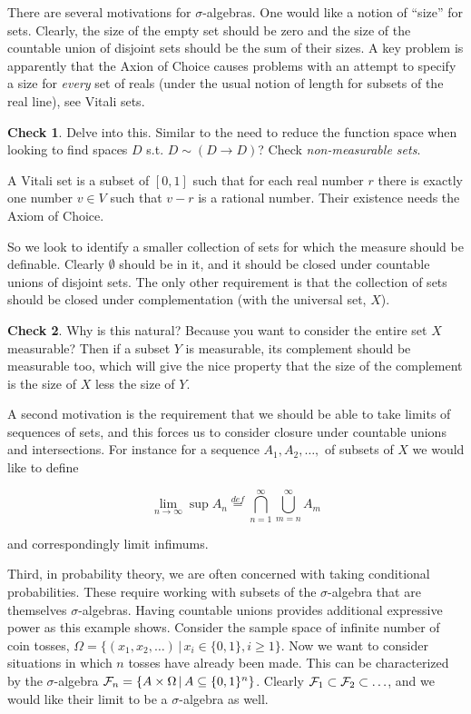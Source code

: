 \documentclass{article}
\newcommand{\alt}{\,|\,}
\newcommand{\defeq}{\stackrel{{\scriptscriptstyle def}}{=}}
\theoremstyle{definition}
\newtheorem*{CHECK}{{\sc Check}}
\begin{document}
There are several motivations for \(\sigma\)-algebras. One would like a notion of ``size'' for sets. Clearly, the size of the empty set should be zero and the size of the countable union of disjoint sets should be the sum of their sizes. A key problem is apparently that the Axion of Choice causes problems with an attempt to specify a size for {\em every} set of reals (under the usual notion of length for subsets of the real line), see Vitali sets.

\begin{CHECK}
  Delve into this. Similar to the need to reduce the function space when looking to find spaces \(D\) s.t. \(D \sim (D \rightarrow D)\)? Check {\em non-measurable sets}.

  A Vitali set is a subset of \([0,1]\) such that for each real number \(r\) there is exactly one number \(v\in V\) such that \(v-r\) is a rational number. Their existence needs the Axiom of Choice.
\end{CHECK}

So we look to identify a smaller collection of sets for which the measure should be definable. Clearly \(\emptyset\) should be in it, and it should be closed under countable unions of disjoint sets. The only other requirement is that the collection of sets should be closed under complementation (with the universal set, \(X\)).

\begin{CHECK}
Why is this natural? Because you want to consider the entire set \(X\) measurable? Then if a subset \(Y\) is measurable, its complement should be measurable too, which will give the nice property that the size of the complement is the size of \(X\) less the size of \(Y\).
\end{CHECK}

A second motivation is the requirement that we should be able to take limits of sequences of sets, and this forces us to consider closure under countable unions and intersections. For instance for a sequence \(A_1, A_2, \ldots, \) of subsets of \(X\) we would like to define

\[ \lim_{n \to \infty} \sup{} A_n \defeq \bigcap_{n=1}^{\infty} \bigcup_{m=n}^{\infty} A_m
\]

\noindent and correspondingly  limit infimums.

Third, in probability theory, we are often concerned with taking conditional probabilities. These require working with subsets of the \(\sigma\)-algebra that are themselves \(\sigma\)-algebras. Having countable unions provides additional expressive power as this example shows. Consider the sample space of infinite number of coin tosses, \(\Omega=\{(x_1,x_2,\ldots)\alt x_i \in \{0,1\}, i \geq 1\}\). Now we want to consider situations in which \(n\) tosses have already been made. This can be characterized by the \(\sigma\)-algebra \({\cal F}_n = \{A \times \Omega \alt A \subseteq \{0,1\}^n\}\). Clearly \({\cal F}_1 \subset {\cal F}_2 \subset \ldots\), and we would like their limit to be a \(\sigma\)-algebra as well.
\end{document}
